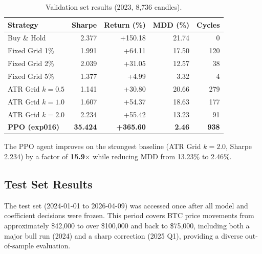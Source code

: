 \documentclass[11pt, a4paper]{article}
\begin{document}
\begin{table}[H]
\centering
\caption{Validation set results (2023, 8,736 candles).}
\label{tab:val_results}
\setlength{\tabcolsep}{6pt}
\begin{tabular}{lrrrr}
\toprule
Strategy & Sharpe & Return (\%) & MDD (\%) & Cycles \\
\midrule
Buy \& Hold           &  2.377 & +150.18 & 21.74 &    0 \\
Fixed Grid 1\%        &  1.991 &  +64.11 & 17.50 &  120 \\
Fixed Grid 2\%        &  2.039 &  +31.05 & 12.57 &   38 \\
Fixed Grid 5\%        &  1.377 &   +4.99 &  3.32 &    4 \\
ATR Grid $k{=}0.5$    &  1.141 &  +30.80 & 20.66 &  279 \\
ATR Grid $k{=}1.0$    &  1.607 &  +54.37 & 18.63 &  177 \\
ATR Grid $k{=}2.0$    &  2.234 &  +55.42 & 13.23 &   91 \\
\midrule
\textbf{PPO (exp016)} & \textbf{35.424} & \textbf{+365.60} & \textbf{2.46} & \textbf{938} \\
\bottomrule
\end{tabular}
\end{table}

The PPO agent improves on the strongest baseline (ATR Grid $k{=}2.0$, Sharpe 2.234)
by a factor of \textbf{15.9$\times$} while reducing MDD from 13.23\% to 2.46\%.

\subsection{Test Set Results}
\label{sec:test-results}

The test set (2024-01-01 to 2026-04-09) was accessed once after all model
and coefficient decisions were frozen.
This period covers BTC price movements from approximately \$42,000 to over
\$100,000 and back to \$75,000, including both a major bull run (2024) and a
sharp correction (2025 Q1), providing a diverse out-of-sample evaluation.
\end{document}
